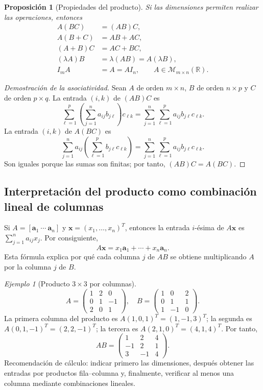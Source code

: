 \documentclass[12pt]{article}
\newtheorem{proposicion}[definicion]{Proposición}
\theoremstyle{remark}
\newtheorem{ejemplo}[definicion]{Ejemplo}
\newcommand{\R}{\mathbb{R}}
\newcommand{\Mat}[2]{\mathcal{M}_{#1\times #2}}
\newcommand{\vect}[1]{\boldsymbol{#1}}
\begin{document}
\begin{proposicion}[Propiedades del producto]
Si las dimensiones permiten realizar las operaciones, entonces
\begin{align*}
A(BC)&=(AB)C,\\
A(B+C)&=AB+AC,\\
(A+B)C&=AC+BC,\\
(\lambda A)B&=\lambda(AB)=A(\lambda B),\\
I_mA&=A=AI_n,\qquad A\in\Mat{m}{n}(\R).
\end{align*}
\end{proposicion}
\begin{proof}[Demostración de la asociatividad]
Sean $A$ de orden $m\times n$, $B$ de orden $n\times p$ y $C$ de orden $p\times q$. La entrada $(i,k)$ de $(AB)C$ es
\[
\sum_{\ell=1}^{p}\left(\sum_{j=1}^{n}a_{ij}b_{j\ell}\right)c_{\ell k}
=\sum_{j=1}^{n}\sum_{\ell=1}^{p}a_{ij}b_{j\ell}c_{\ell k}.
\]
La entrada $(i,k)$ de $A(BC)$ es
\[
\sum_{j=1}^{n}a_{ij}\left(\sum_{\ell=1}^{p}b_{j\ell}c_{\ell k}\right)
=\sum_{j=1}^{n}\sum_{\ell=1}^{p}a_{ij}b_{j\ell}c_{\ell k}.
\]
Son iguales porque las sumas son finitas; por tanto, $(AB)C=A(BC)$.
\end{proof}

\subsection{Interpretación del producto como combinación lineal de columnas}
Si $A=[\vect a_1\ \cdots\ \vect a_n]$ y $\vect x=(x_1,\ldots,x_n)^T$, entonces la entrada $i$-ésima de $A\vect x$ es $\sum_{j=1}^na_{ij}x_j$. Por consiguiente,
\[
\boxed{A\vect x=x_1\vect a_1+\cdots+x_n\vect a_n.}
\]
Esta fórmula explica por qué cada columna $j$ de $AB$ se obtiene multiplicando $A$ por la columna $j$ de $B$.
\begin{ejemplo}[Producto $3\times3$ por columnas]
\[
A=\begin{pmatrix}1&2&0\\0&1&-1\\2&0&1\end{pmatrix},\quad
B=\begin{pmatrix}1&0&2\\0&1&1\\1&-1&0\end{pmatrix}.
\]
La primera columna del producto es $A(1,0,1)^T=(1,-1,3)^T$; la segunda es $A(0,1,-1)^T=(2,2,-1)^T$; la tercera es $A(2,1,0)^T=(4,1,4)^T$. Por tanto,
\[
\boxed{AB=\begin{pmatrix}1&2&4\\-1&2&1\\3&-1&4\end{pmatrix}.}
\]
Recomendación de cálculo: indicar primero las dimensiones, después obtener las entradas por productos fila--columna y, finalmente, verificar al menos una columna mediante combinaciones lineales.
\end{ejemplo}
\end{document}
